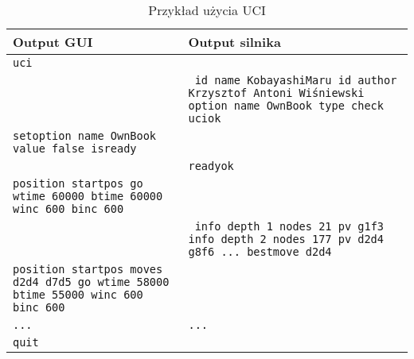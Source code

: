 \begin{table}[htb] \footnotesize
\centering
\caption{Przykład użycia UCI}
\label{tab:przyklad_uci}
\begin{tabularx}{\linewidth}{|>{\raggedright\arraybackslash}p{.51\linewidth}>{\raggedleft\arraybackslash}X|}\hline
\textbf{Output GUI} & \textbf{Output silnika} \\ \hline\hline

\texttt{uci} & \texttt{} \\ \hline
\texttt{} & \texttt{
    id name KobayashiMaru \linebreak
    id author Krzysztof Antoni Wiśniewski \linebreak
    option name OwnBook type check \linebreak
    uciok
} \\ \hline
\texttt{setoption name OwnBook value false \linebreak
    isready
} & \texttt{} \\ \hline

\texttt{} & \texttt{readyok} \\ \hline
\texttt{position startpos \linebreak
    go wtime 60000 btime 60000 winc 600 binc 600} & \texttt{} \\ \hline
\texttt{} & \texttt{
    info depth 1 nodes 21 pv g1f3\linebreak
    info depth 2 nodes 177 pv d2d4 g8f6\linebreak
    ... \linebreak
    bestmove d2d4} \\ \hline

\texttt{position startpos moves d2d4 d7d5\linebreak
go wtime 58000 btime 55000 winc 600 binc 600} & \texttt{} \\ \hline

\texttt{...} & \texttt{...} \\ \hline
\texttt{quit} & \texttt{} \\ \hline

\end{tabularx}
\end{table}



